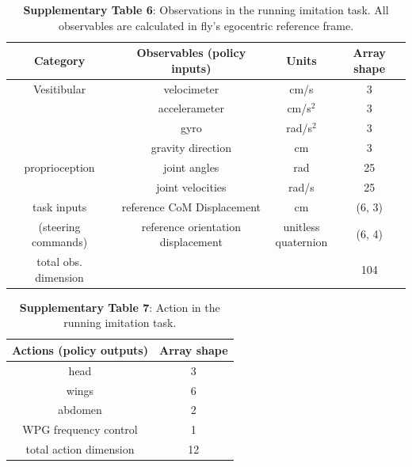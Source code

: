 \documentclass[sn-mathphys-num]{sn-jnl}%
\theoremstyle{thmstyleone}%
\theoremstyle{thmstyletwo}%
\theoremstyle{thmstylethree}%
\begin{document}
\begin{appendices}
\begin{table}[htbp]
	\centering
	\small
	\caption{\textbf{Supplementary Table 6}: 
		Observations in the running imitation task. 
		All observables are calculated in fly’s egocentric reference frame.}
	\begin{tabular}{cccc}
		\toprule
		Category         &        Observables (policy inputs)  & Units  & Array shape  \\
		\midrule
		Vesitibular     &  velocimeter      &   cm/s & 3  \\
		     &  accelerameter      &   cm/s$ ^2 $ & 3  \\
		     &  gyro      &   rad/s$ ^2 $ & 3  \\
		     &  gravity direction      &   cm & 3  \\
		\midrule
		proprioception     &  joint angles      &   rad & 25  \\
		     &  joint velocities      &   rad/s & 25  \\
		\midrule
		task inputs     &  reference CoM Displacement      &   cm & (6, 3)  \\
		(steering commands)     &  reference orientation displacement      &   \makecell{unitless \\quaternion} & (6, 4)  \\
		\midrule
		total obs. dimension     &        &    & 104  \\
		\bottomrule
	\end{tabular}%
	\label{tab:s_6}%
\end{table}%



\begin{table}[htbp]
	\centering
	\caption{\textbf{Supplementary Table 7}: Action in the running imitation task.}
	\small
	\begin{tabular}{cc}
		\toprule
		Actions (policy outputs)         &        Array shape     \\
		\midrule
		head      &   3      \\
		wings      &   6      \\
		abdomen      &   2      \\
		WPG frequency control      &   1      \\
		\midrule
		total action dimension      &   12      \\
		\bottomrule
	\end{tabular}%
	\label{tab:s_7}%
\end{table}%



\end{appendices}
\end{document}
